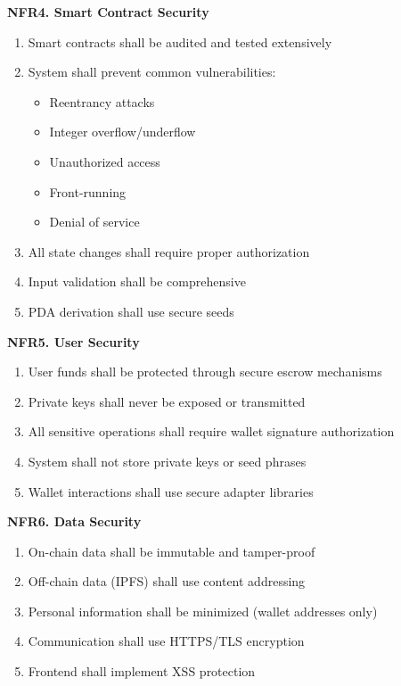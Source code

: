 \documentclass[a4paper,13pt,twoside]{report}
\theoremstyle{definition}
\begin{document}
\textbf{NFR4. Smart Contract Security}

\begin{enumerate}
    \item Smart contracts shall be audited and tested extensively
    \item System shall prevent common vulnerabilities:
    \begin{itemize}
        \item Reentrancy attacks
        \item Integer overflow/underflow
        \item Unauthorized access
        \item Front-running
        \item Denial of service
    \end{itemize}
    \item All state changes shall require proper authorization
    \item Input validation shall be comprehensive
    \item PDA derivation shall use secure seeds
\end{enumerate}

\textbf{NFR5. User Security}

\begin{enumerate}
    \item User funds shall be protected through secure escrow mechanisms
    \item Private keys shall never be exposed or transmitted
    \item All sensitive operations shall require wallet signature authorization
    \item System shall not store private keys or seed phrases
    \item Wallet interactions shall use secure adapter libraries
\end{enumerate}

\textbf{NFR6. Data Security}

\begin{enumerate}
    \item On-chain data shall be immutable and tamper-proof
    \item Off-chain data (IPFS) shall use content addressing
    \item Personal information shall be minimized (wallet addresses only)
    \item Communication shall use HTTPS/TLS encryption
    \item Frontend shall implement XSS protection
\end{enumerate}
\end{document}
